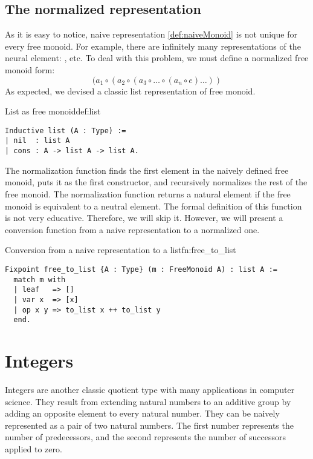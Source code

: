 \subsection{The normalized representation}
As it is easy to notice, naive representation \ref{def:naiveMonoid} is not unique for every free monoid. For example, there are infinitely many representations of the neural element: ,  etc. To deal with this problem, we must define a normalized free monoid form:
$$
    (a_1 \circ (a_2 \circ (a_3 \circ \dots  \circ (a_n \circ e) \dots ))
$$
As expected, we devised a classic list representation of free monoid. 
\begin{defi}{List as free monoid}{def:list}
\begin{verbatim}
Inductive list (A : Type) :=
| nil  : list A
| cons : A -> list A -> list A.
\end{verbatim}
\end{defi}
The normalization function finds the first element in the naively defined free monoid, puts it as the first constructor, and recursively normalizes the rest of the free monoid. The normalization function returns a natural element if the free monoid is equivalent to a neutral element. The formal definition of this function is not very educative. Therefore, we will skip it. However, we will present a conversion function from a naive representation to a normalized one.
\begin{func}{Conversion from a naive representation to a list}{fn:free_to_list}
\begin{verbatim}
Fixpoint free_to_list {A : Type} (m : FreeMonoid A) : list A :=
  match m with
  | leaf   => []
  | var x  => [x]
  | op x y => to_list x ++ to_list y
  end.
\end{verbatim}
\end{func}
\section{Integers}
Integers are another classic quotient type with many applications in computer science. They result from extending natural numbers to an additive group by adding an opposite element to every natural number. They can be naively represented as a pair of two natural numbers. The first number represents the number of predecessors, and the second represents the number of successors applied to zero.

